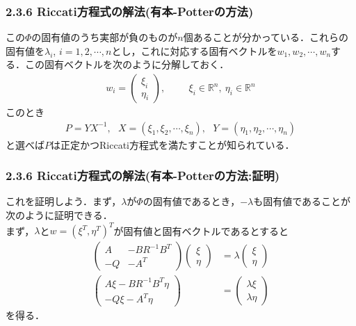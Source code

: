 \begin{frame}[t]
\frametitle{2.3.6 Riccati方程式の解法(有本-Potterの方法)}
この$\Phi$の固有値のうち実部が負のものが$n$個あることが分かっている．これらの固有値を$\lambda_i$, $i=1,2,\cdots,n$とし，これに対応する固有ベクトルを$w_1, w_2, \cdots, w_n$する．この固有ベクトルを次のように分解しておく．
\begin{align}
 w_i = \left(\begin{array}{c}
	      \xi_i \\
	      \eta_i
	     \end{array}\right), \hspace{1cm} \xi_i \in {\mathbb R}^n, \ \eta_i \in {\mathbb R}^n
\end{align}
このとき
\begin{align}
	P = Y X^{-1}, \ \ \ 
	X = (\xi_1, \xi_2, \cdots, \xi_n), \ \ \ 
	Y = (\eta_1, \eta_2, \cdots, \eta_n)
\end{align}
と選べば$P$は正定かつRiccati方程式を満たすことが知られている．
\end{frame}

\begin{frame}[t]
\frametitle{2.3.6 Riccati方程式の解法(有本-Potterの方法:証明)}

これを証明しよう．まず，$\lambda$が$\Phi$の固有値であるとき，$-\lambda$も固有値であることが次のように証明できる．\\[3mm]

まず，$\lambda$と$w = (\xi^T, \eta^T)^T$が固有値と固有ベクトルであるとすると
\begin{align}
	\left(\begin{array}{cc}
	       A  & - B R^{-1} B^T \\
	       -Q & - A^T
	\end{array}\right)
		  \left(\begin{array}{c}
	        \xi \\
	        \eta
	      \end{array}\right)
	&= \lambda
		  \left(\begin{array}{c}
	        \xi \\
	        \eta
	      \end{array}\right)
\nonumber \\
	\left(\begin{array}{c}
	       A \xi - B R^{-1} B^T \eta \\
	       -Q\xi - A^T \eta
	\end{array}\right)
	&=
		  \left(\begin{array}{c}
	        \lambda \xi \\
	        \lambda \eta
	      \end{array}\right)
\label{potter_1}
\end{align}
を得る．
\end{frame}

